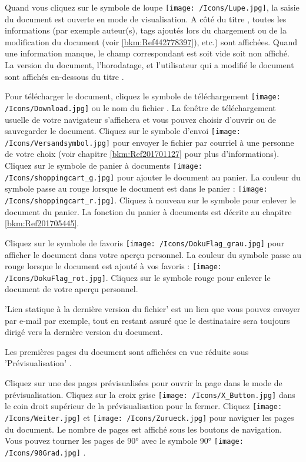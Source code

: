 Quand vous cliquez sur le symbole de loupe \texttt{[image: /Icons/Lupe.jpg]}, la saisie du document est ouverte en mode de visualisation. A côté du titre , toutes les informations (par exemple auteur(s), tags ajoutés lors du chargement ou de la modification du document (voir \ref{bkm:Ref442778397}), etc.) sont affichées. Quand une information manque, le champ correspondant est soit vide soit non affiché. La version du document, l'horodatage, et l'utilisateur qui a modifié le document sont affichés en-dessous du titre . \newline

Pour télécharger le document, cliquez le symbole de téléchargement \texttt{[image: /Icons/Download.jpg]} ou le nom du fichier . La fenêtre de téléchargement usuelle de votre navigateur s'affichera et vous pouvez choisir d'ouvrir ou de sauvegarder le document. Cliquez sur le symbole d'envoi \texttt{[image: /Icons/Versandsymbol.jpg]}  pour envoyer le fichier par courriel à une personne de votre choix (voir chapitre \ref{bkm:Ref201701127} pour plus d'informations). Cliquez sur le symbole de panier à documents \texttt{[image: /Icons/shoppingcart\_g.jpg]}  pour ajouter le document au panier. La couleur du symbole passe au rouge lorsque le document est dans le panier : \texttt{[image: /Icons/shoppingcart\_r.jpg]}. Cliquez à nouveau sur le symbole pour enlever le document du panier. La fonction du panier à documents est décrite au chapitre \ref{bkm:Ref201705445}. \newline

Cliquez sur le symbole de favoris \texttt{[image: /Icons/DokuFlag\_grau.jpg]}  pour afficher le document dans votre aperçu personnel. La couleur du symbole passe au rouge lorsque le document est ajouté à vos favoris : \texttt{[image: /Icons/DokuFlag\_rot.jpg]}. Cliquez sur le symbole rouge pour enlever le document de votre aperçu personnel. \newline

'Lien statique à la dernière version du fichier'  est un lien que vous pouvez envoyer par e-mail par exemple, tout en restant assuré que le destinataire sera toujours dirigé vers la dernière version du document.

Les premières pages du document sont affichées en vue réduite sous 'Prévisualisation' .

\vspace{\baselineskip}

Cliquez sur une des pages prévisualisées  pour ouvrir la page dans le mode de prévisualisation. Cliquez sur la croix grise \texttt{[image: /Icons/X\_Button.jpg]}  dans le coin droit supérieur de la prévisualisation pour la fermer. Cliquez \texttt{[image: /Icons/Weiter.jpg]} et \texttt{[image: /Icons/Zurueck.jpg]}  pour naviguer les pages du document. Le nombre de pages  est affiché sous les boutons de navigation. Vous pouvez tourner les pages de 90° avec le symbole 90° \texttt{[image: /Icons/90Grad.jpg]} .

